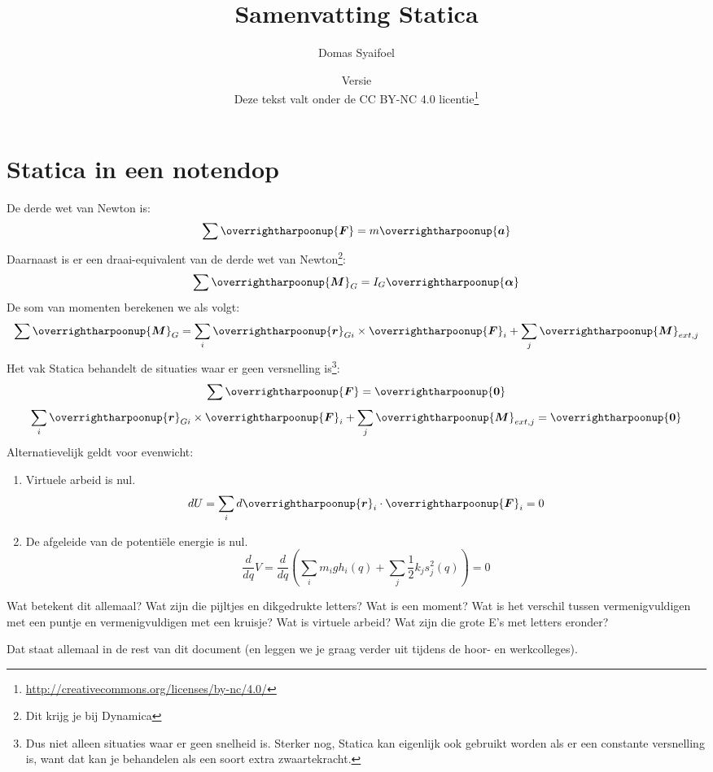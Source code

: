 \documentclass{article}
\title{Samenvatting Statica}
\author{Domas Syaifoel}
\date{Versie \DTMnow \\ Deze tekst valt onder de CC BY-NC 4.0 licentie\footnote{\url{http://creativecommons.org/licenses/by-nc/4.0/}}}
\renewcommand{\v}[1]{\overrightharpoonup{\bm{#1}}}
\newcommand{\F}{\v{F}}
\newcommand{\M}{\v{M}}
\renewcommand{\r}{\v{r}}
\begin{document}
\maketitle


\section{Statica in een notendop}

De derde wet van Newton is:
$$\sum\F = m\v{a}$$
Daarnaast is er een draai-equivalent van de derde wet van Newton\footnote{Dit krijg je bij Dynamica}:
$$\sum\M_G = I_G\v{\alpha}$$
De som van momenten berekenen we als volgt:
$$\sum\M_G = \sum_i \r_{Gi}\times \F_i + \sum_j \M_{ext, j}$$
Het vak Statica behandelt de situaties waar er geen versnelling is\footnote{Dus niet alleen situaties waar er geen snelheid is. Sterker nog, Statica kan eigenlijk ook gebruikt worden als er een constante versnelling is, want dat kan je behandelen als een soort extra zwaartekracht.}:
$$\sum\F = \v{0}$$
$$\sum_i \r_{Gi}\times \F_i + \sum_j \M_{ext, j}= \v{0}$$
Alternatievelijk geldt voor evenwicht:
\begin{enumerate}
    \item Virtuele arbeid is nul. 
    $$dU = \sum_i d\v{r}_i\cdot\F_i = 0$$
    \item De afgeleide van de potenti\"ele energie is nul.
    $$\frac{d}{dq}V = \frac{d}{dq}\left(\sum_i m_igh_i(q) + \sum_j\frac{1}{2}k_js_j^2(q)\right)=0$$
\end{enumerate}

Wat betekent dit allemaal? Wat zijn die pijltjes en dikgedrukte letters? Wat is een moment? Wat is het verschil tussen vermenigvuldigen met een puntje en vermenigvuldigen met een kruisje? Wat is virtuele arbeid? Wat zijn die grote E's met letters eronder?

Dat staat allemaal in de rest van dit document (en leggen we je graag verder uit tijdens de hoor- en werkcolleges).
\tableofcontents


\newpage
\end{document}
